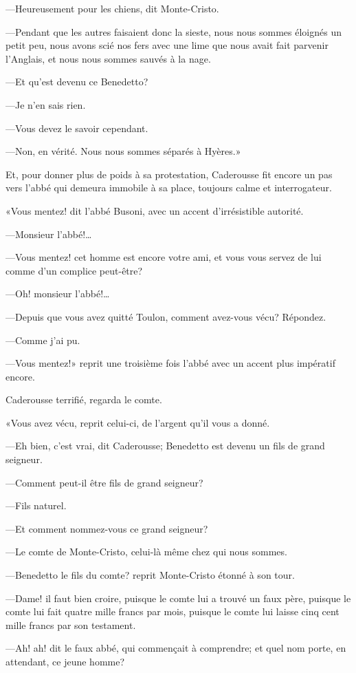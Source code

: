 —Heureusement pour les chiens, dit Monte-Cristo. 

—Pendant que les autres faisaient donc la sieste, nous nous sommes éloignés un petit peu, nous avons scié nos fers avec une lime que nous avait fait parvenir l'Anglais, et nous nous sommes sauvés à la nage. 

—Et qu'est devenu ce Benedetto? 

—Je n'en sais rien. 

—Vous devez le savoir cependant. 

—Non, en vérité. Nous nous sommes séparés à Hyères.» 

Et, pour donner plus de poids à sa protestation, Caderousse fit encore un pas vers l'abbé qui demeura immobile à sa place, toujours calme et interrogateur. 

«Vous mentez! dit l'abbé Busoni, avec un accent d'irrésistible autorité. 

—Monsieur l'abbé!\dots 

—Vous mentez! cet homme est encore votre ami, et vous vous servez de lui comme d'un complice peut-être? 

—Oh! monsieur l'abbé!\dots 

—Depuis que vous avez quitté Toulon, comment avez-vous vécu? Répondez. 

—Comme j'ai pu. 

—Vous mentez!» reprit une troisième fois l'abbé avec un accent plus impératif encore. 

Caderousse terrifié, regarda le comte. 

«Vous avez vécu, reprit celui-ci, de l'argent qu'il vous a donné. 

—Eh bien, c'est vrai, dit Caderousse; Benedetto est devenu un fils de grand seigneur. 

—Comment peut-il être fils de grand seigneur? 

—Fils naturel. 

—Et comment nommez-vous ce grand seigneur? 

—Le comte de Monte-Cristo, celui-là même chez qui nous sommes. 

—Benedetto le fils du comte? reprit Monte-Cristo étonné à son tour. 

—Dame! il faut bien croire, puisque le comte lui a trouvé un faux père, puisque le comte lui fait quatre mille francs par mois, puisque le comte lui laisse cinq cent mille francs par son testament. 

—Ah! ah! dit le faux abbé, qui commençait à comprendre; et quel nom porte, en attendant, ce jeune homme? 

